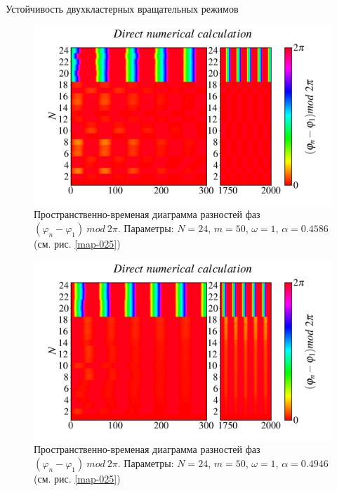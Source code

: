 \begin{chapter}{Устойчивость двухкластерных вращательных режимов}
	\begin{figure}[h!]\center
		\includegraphics[width=1\columnwidth]{pictures/Figure_M_50_A_0.4586_O_1.png}
		\caption{Пространственно-временая диаграмма разностей фаз $(\varphi_n - \varphi_1) \ mod \ 2\pi$.
		Параметры: $N=24$, $m = 50$, $\omega = 1$, $\alpha = 0.4586$ (см. рис. \ref{map-025})}
		\label{st-c-1}
	\end{figure}

	\begin{figure}[h!]\center
		\includegraphics[width=1\columnwidth]{pictures/Figure_M_50_A_0.4946_O_1.png}
		\caption{Пространственно-временая диаграмма разностей фаз $(\varphi_n - \varphi_1) \ mod \ 2\pi$.
		Параметры: $N=24$, $m = 50$, $\omega = 1$, $\alpha = 0.4946$ (см. рис. \ref{map-025})}
		\label{st-c-2}
	\end{figure}


\end{chapter}
